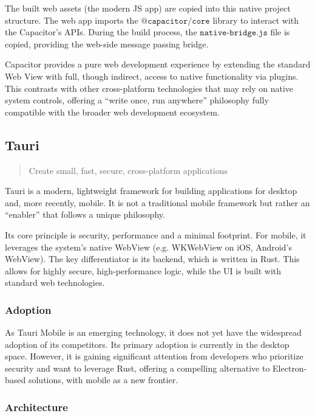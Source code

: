     The built web assets (the modern JS app) are copied into this native project structure. The web app imports the $\texttt{@capacitor/core}$ library to interact with the Capacitor's APIs. During the build process, the $\texttt{native-bridge.js}$ file is copied, providing the web-side message passing bridge.
    
    
    Capacitor provides a pure web development experience by extending the standard Web View with full, though indirect, access to native functionality via plugins. This contrasts with other cross-platform technologies that may rely on native system controls, offering a ``write once, run anywhere'' philosophy fully compatible with the broader web development ecosystem.\\\cite{Ionic:02}
            

    \subsection{Tauri}
        \begin{quote}
             Create small, fast, secure, cross-platform applications \cite{Tauri:00}
        \end{quote}
    
        Tauri is a modern, lightweight framework for building applications for desktop and, more recently, mobile. It is not a traditional mobile framework but rather an ``enabler'' that follows a unique philosophy.
        
        Its core principle is security, performance and a minimal footprint. For mobile, it leverages the system's native WebView (e.g. WKWebView on iOS, Android's WebView). The key differentiator is its backend, which is written in Rust. This allows for highly secure, high-performance logic, while the UI is built with standard web technologies. \cite{Tauri:00}
        
        \subsubsection{Adoption}
        As Tauri Mobile is an emerging technology, it does not yet have the widespread adoption of its competitors. Its primary adoption is currently in the desktop space. However, it is gaining significant attention from developers who prioritize security and want to leverage Rust, offering a compelling alternative to Electron-based solutions, with mobile as a new frontier.

        \subsubsection{Architecture}
        
